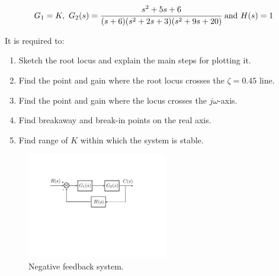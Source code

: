 \documentclass[a4paper,11pt]{article}
\begin{document}
\begin{equation}
G_1=K, \ G_2(s)= \cfrac{s^2+5s+6}{(s+6)(s^2+2s+3)(s^2 +9s +20)} \ \text{and} \ H(s)=1
\label{eq:ex1}
\end{equation}

\noindent It is required to:
\begin{enumerate}
\item Sketch the root locus and explain the main steps for plotting it. 
\item Find the point and gain where the root locus crosses the $\zeta=0.45$ line.
\item Find the point and gain where the locus crosses the $j\omega$-axis.
\item Find breakaway and break-in points on the real axis.
\item Find range of $K$ within which the system is stable.
\end{enumerate}

\begin{figure}[ht!]
\begin{center}\includegraphics[width=0.55\textwidth]{Figures/FB_general} \end{center}
 \vskip-0.5cm\caption{Negative feedback system.}
\label{fig:ex}
\end{figure}
\end{document}
